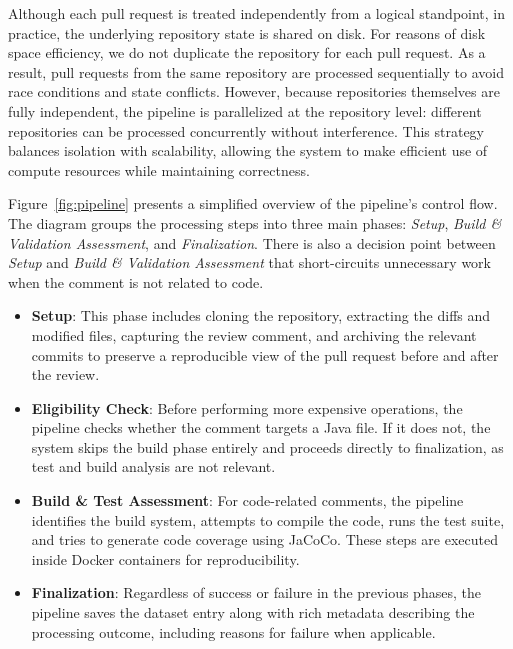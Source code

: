 Although each pull request is treated independently from a logical standpoint, in practice, the
underlying repository state is shared on disk. For reasons of disk space efficiency, we do not
duplicate the repository for each pull request. As a result, pull requests from the same repository
are processed sequentially to avoid race conditions and state conflicts. However, because
repositories themselves are fully independent, the pipeline is parallelized at the repository level:
different repositories can be processed concurrently without interference. This strategy balances
isolation with scalability, allowing the system to make efficient use of compute resources while
maintaining correctness.

Figure~\ref{fig:pipeline} presents a simplified overview of the pipeline’s control flow. The diagram
groups the processing steps into three main phases: \textit{Setup}, \textit{Build \& Validation
	Assessment}, and \textit{Finalization}. There is also a decision point between \textit{Setup} and
\textit{Build \& Validation Assessment} that short-circuits unnecessary work when the comment is not
related to code.

\begin{itemize}
	\item \textbf{Setup}: This phase includes cloning the repository, extracting the diffs and
	      modified files, capturing the review comment, and archiving the relevant commits to preserve
	      a reproducible view of the pull request before and after the review.

	\item \textbf{Eligibility Check}: Before performing more expensive operations, the pipeline
	      checks whether the comment targets a Java file. If it does not, the system skips the
	      build phase entirely and proceeds directly to finalization, as test and build analysis
	      are not relevant.

	\item \textbf{Build \& Test Assessment}: For code-related comments, the pipeline identifies the build system,
	      attempts to compile the code, runs the test suite, and tries to generate code coverage using
	      JaCoCo. These steps are executed inside Docker containers for reproducibility.

	\item \textbf{Finalization}: Regardless of success or failure in the previous phases, the
	      pipeline saves the dataset entry along with rich metadata describing the processing outcome,
	      including reasons for failure when applicable.
\end{itemize}

